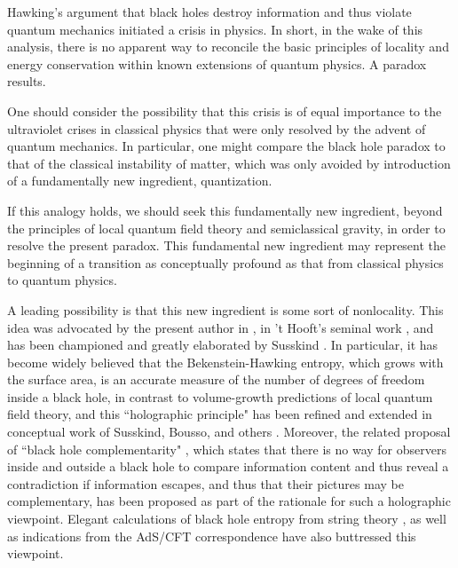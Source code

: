 \Date{}


Hawking's argument that black holes destroy information  and thus violate quantum mechanics initiated a crisis  in physics.  In short, in the wake of this analysis, there is no apparent way to reconcile
the basic principles of locality and energy conservation within known extensions of quantum physics.  A paradox results.

One should consider the possibility that this crisis is of equal importance  to the ultraviolet crises in classical physics that were only resolved by the advent of quantum mechanics.  In particular, one might compare the black hole paradox to that of the classical instability of matter, which was only avoided by introduction of a fundamentally new ingredient,  quantization.

If this analogy holds, we should seek this fundamentally new ingredient, beyond the principles of local quantum field theory and semiclassical gravity, in order to resolve the present paradox.  This fundamental new ingredient may represent the beginning of a transition as conceptually profound as that from classical physics to quantum physics.

A leading possibility is that this new ingredient is some sort of nonlocality.   This idea was advocated by the present author in
, in 't Hooft's seminal work ,  and has been
championed and greatly elaborated by Susskind \Sussholo.  In particular, it has become widely believed that the Bekenstein-Hawking entropy, which grows with the surface area, is an accurate measure of the number of degrees of freedom inside a black hole, in contrast to volume-growth predictions of local quantum field theory, and this  ``holographic principle" has been refined and extended in conceptual work of Susskind, Bousso, and others .  Moreover, the related proposal of  ``black hole complementarity" , which states that there is no way for observers inside and outside a black hole to compare information content and thus reveal a contradiction if information escapes, and thus that their pictures may be complementary, has been proposed as part of the rationale for such a holographic viewpoint.  Elegant calculations of black hole entropy from string theory , as well as indications from the AdS/CFT correspondence  have also buttressed this viewpoint.

